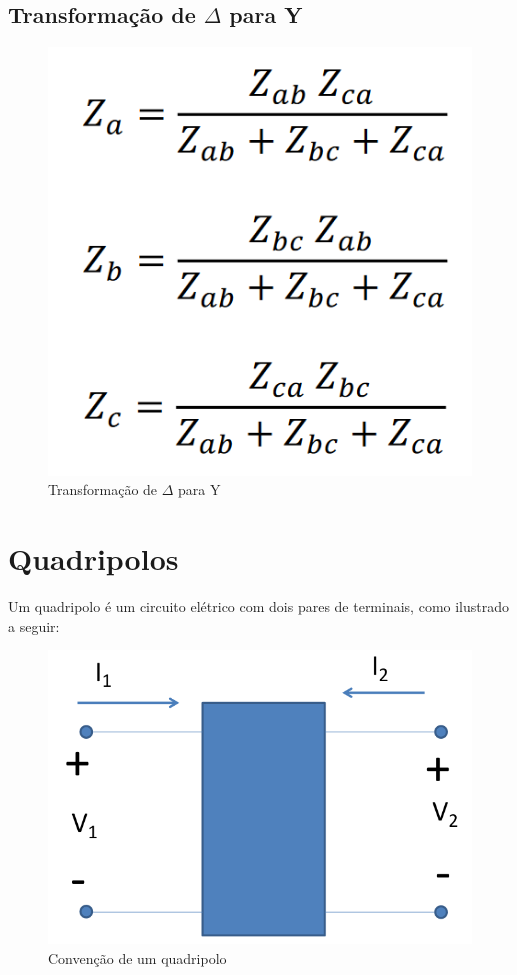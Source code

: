 \documentclass[a4paper, 12pt]{article}
\begin{document}
	\subsection{Transformação de $\Delta$ para Y}
		\begin{figure}[h]
			\centering
			\includegraphics[scale=0.4]{a6.png}
			\caption{Transformação de $\Delta$ para Y}
		\end{figure}


\newpage
\section{Quadripolos}
	Um quadripolo é um circuito elétrico com dois pares de terminais, como ilustrado a seguir:
	\begin{figure}[h]
		\centering
		\includegraphics[scale=0.4]{a7.png}
		\caption{Convenção de um quadripolo}
		\label{quad}
	\end{figure}
	
\end{document}

